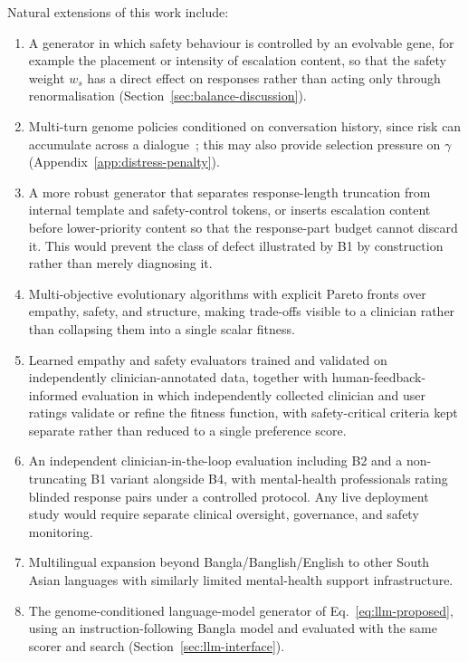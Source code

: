 \documentclass[mathematics,article,submit,xetex,moreauthors]{Definitions/mdpi}
\begin{document}
Natural extensions of this work include:
\begin{enumerate}
  \item A generator in which safety behaviour is controlled by an evolvable
  gene, for example the placement or intensity of escalation content, so that
  the safety weight $w_s$ has a direct effect on responses rather than acting
  only through renormalisation (Section~\ref{sec:balance-discussion}).
  \item Multi-turn genome policies conditioned on conversation history, since
  risk can accumulate across a dialogue~\cite{journey2026}; this may also
  provide selection pressure on $\gamma$ (Appendix~\ref{app:distress-penalty}).

  \item A more robust generator that separates response-length truncation from
  internal template and safety-control tokens, or inserts escalation content
  before lower-priority content so that the response-part budget cannot discard
  it. This would prevent the class of defect illustrated by B1 by construction
  rather than merely diagnosing it.

  \item Multi-objective evolutionary algorithms with explicit Pareto fronts over
  empathy, safety, and structure, making trade-offs visible to a clinician
  rather than collapsing them into a single scalar fitness.

  \item Learned empathy and safety evaluators trained and validated on
  independently clinician-annotated data, together with human-feedback-informed
  evaluation in which independently collected clinician and user ratings
  validate or refine the fitness function, with safety-critical criteria kept
  separate rather than reduced to a single preference score.

  \item An independent clinician-in-the-loop evaluation including B2 and a
  non-truncating B1 variant alongside B4, with mental-health professionals
  rating blinded response pairs under a controlled protocol. Any live deployment
  study would require separate clinical oversight, governance, and safety
  monitoring.

  \item Multilingual expansion beyond Bangla/Banglish/English to other South
  Asian languages with similarly limited mental-health support infrastructure.
  \item The genome-conditioned language-model generator of
  Eq.~\eqref{eq:llm-proposed}, using an instruction-following Bangla model and
  evaluated with the same scorer and search (Section~\ref{sec:llm-interface}).
\end{enumerate}
\end{document}

